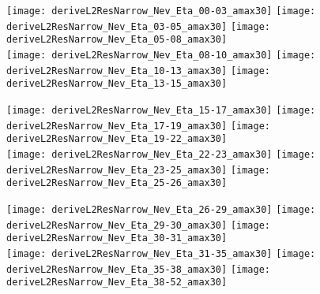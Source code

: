 \documentclass[landscape,10pt]{beamer} %
\begin{document}
\newpage
\begin{figure}[p]
\centering
  \texttt{[image: deriveL2ResNarrow\_Nev\_Eta\_00-03\_amax30]}
  \texttt{[image: deriveL2ResNarrow\_Nev\_Eta\_03-05\_amax30]}
  \texttt{[image: deriveL2ResNarrow\_Nev\_Eta\_05-08\_amax30]}
\\
  \texttt{[image: deriveL2ResNarrow\_Nev\_Eta\_08-10\_amax30]}
  \texttt{[image: deriveL2ResNarrow\_Nev\_Eta\_10-13\_amax30]}
  \texttt{[image: deriveL2ResNarrow\_Nev\_Eta\_13-15\_amax30]}
\end{figure}
\newpage
\begin{figure}[p]
\centering
  \texttt{[image: deriveL2ResNarrow\_Nev\_Eta\_15-17\_amax30]}
  \texttt{[image: deriveL2ResNarrow\_Nev\_Eta\_17-19\_amax30]}
  \texttt{[image: deriveL2ResNarrow\_Nev\_Eta\_19-22\_amax30]}
\\
  \texttt{[image: deriveL2ResNarrow\_Nev\_Eta\_22-23\_amax30]}
  \texttt{[image: deriveL2ResNarrow\_Nev\_Eta\_23-25\_amax30]}
  \texttt{[image: deriveL2ResNarrow\_Nev\_Eta\_25-26\_amax30]}
\end{figure}
\newpage
\begin{figure}[p]
\centering
  \texttt{[image: deriveL2ResNarrow\_Nev\_Eta\_26-29\_amax30]}
  \texttt{[image: deriveL2ResNarrow\_Nev\_Eta\_29-30\_amax30]}
  \texttt{[image: deriveL2ResNarrow\_Nev\_Eta\_30-31\_amax30]}
\\
  \texttt{[image: deriveL2ResNarrow\_Nev\_Eta\_31-35\_amax30]}
  \texttt{[image: deriveL2ResNarrow\_Nev\_Eta\_35-38\_amax30]}
  \texttt{[image: deriveL2ResNarrow\_Nev\_Eta\_38-52\_amax30]}
\end{figure}
\end{document}
